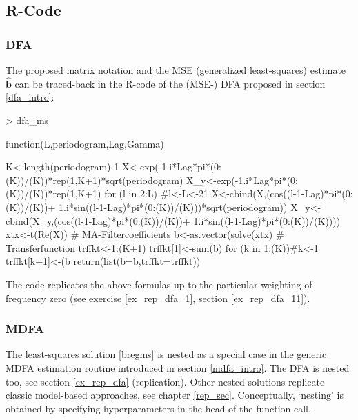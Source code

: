\documentclass[a4paper]{book}
\begin{document}
\subsection{R-Code}

\subsubsection{DFA}

The proposed matrix notation and the MSE (generalized least-squares) estimate $\hat{\mathbf{b}}$ can be traced-back in the R-code of the (MSE-) DFA proposed in section \ref{dfa_intro}:

\begin{Schunk}
\begin{Sinput}
> dfa_ms
\end{Sinput}
\begin{Soutput}
function(L,periodogram,Lag,Gamma)
{
  
  K<-length(periodogram)-1
  X<-exp(-1.i*Lag*pi*(0:(K))/(K))*rep(1,K+1)*sqrt(periodogram)
  X_y<-exp(-1.i*Lag*pi*(0:(K))/(K))*rep(1,K+1)
  for (l in 2:L)          #l<-L<-21
  {
    X<-cbind(X,(cos((l-1-Lag)*pi*(0:(K))/(K))+
                  1.i*sin((l-1-Lag)*pi*(0:(K))/(K)))*sqrt(periodogram))
    X_y<-cbind(X_y,(cos((l-1-Lag)*pi*(0:(K))/(K))+
                      1.i*sin((l-1-Lag)*pi*(0:(K))/(K))))
  }
  xtx<-t(Re(X))%
  # MA-Filtercoefficients
  b<-as.vector(solve(xtx)%
  # Transferfunction
  trffkt<-1:(K+1)
  trffkt[1]<-sum(b)
  for (k in 1:(K))#k<-1
  {
    trffkt[k+1]<-(b%
  }
  return(list(b=b,trffkt=trffkt))
}
\end{Soutput}
\end{Schunk}
The code replicates the above formulas up to the particular weighting of frequency zero (see exercise \ref{ex_rep_dfa_1}, section \ref{ex_rep_dfa_11}).

\subsubsection{MDFA}

The least-squares solution \ref{bregms} is nested as a special case in the generic MDFA estimation routine introduced in section \ref{mdfa_intro}. The DFA is nested too, see section  \ref{ex_rep_dfa} (replication). Other nested solutions replicate classic model-based approaches, see chapter \ref{rep_sec}. Conceptually, `nesting' is obtained by specifying hyperparameters in the head of the function call.
\end{document}
